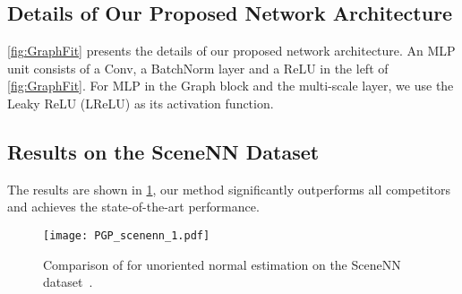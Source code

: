 \documentclass[runningheads]{llncs}
\begin{document}
\subsection{Details of Our Proposed Network Architecture}
\cref{fig:GraphFit} presents the details of our proposed network architecture. An MLP unit consists of a  Conv, a BatchNorm layer and a ReLU in the left of \cref{fig:GraphFit}. For MLP in the Graph block and the multi-scale layer, we use the Leaky ReLU (LReLU) as its activation function.
\subsection{Results on the SceneNN Dataset}
 The  results are shown in \cref{fig:scenenn},  our method significantly outperforms all competitors and achieves the state-of-the-art performance.
\begin{figure}[h]
  \centering
     \texttt{[image: PGP\_scenenn\_1.pdf]}
   \caption{Comparison of  for unoriented normal estimation on the SceneNN dataset~\cite{hua-pointwise-cvpr18}.
   }
   \label{fig:scenenn}
\end{figure}
\end{document}
